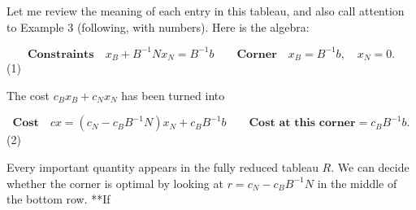 Let me review the meaning of each entry in this tableau, and also call attention to Example 3 (following, with numbers). Here is the algebra:

\[\textbf{Constraints}\quad x_{B}+B^{-1}Nx_{N}=B^{-1}b\qquad\textbf{Corner}\quad x _{B}=B^{-1}b,\quad x_{N}=0.\] (1)

The cost \(c_{B}x_{B}+c_{N}x_{N}\) has been turned into

\[\textbf{Cost}\quad cx=(c_{N}-c_{B}B^{-1}N)x_{N}+c_{B}B^{-1}b\qquad\textbf{Cost at this corner}=c_{B}B^{-1}b.\] (2)

Every important quantity appears in the fully reduced tableau \(R\). We can decide whether the corner is optimal by looking at \(r=c_{N}-c_{B}B^{-1}N\) in the middle of the bottom row. **If 